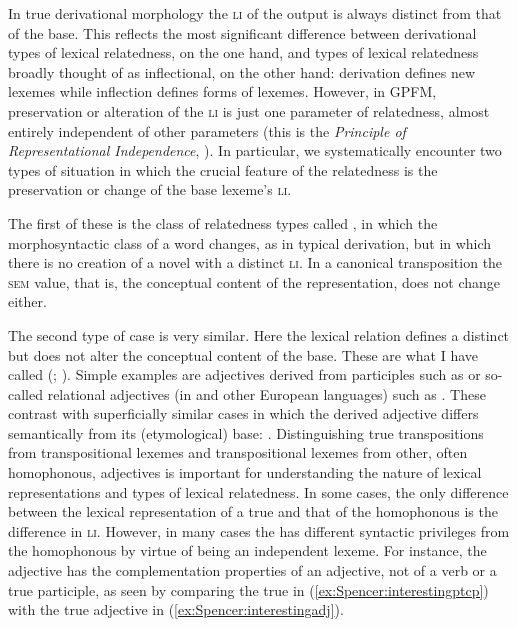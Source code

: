 \documentclass[output=paper]{langsci/langscibook}
\begin{document}
In true derivational morphology the \textsc{li} of the output  is always distinct from that of the base.
This reflects the most significant difference between  derivational types of lexical relatedness, on the one hand, and types of lexical relatedness broadly thought of as inflectional, on the other hand: derivation defines new lexemes while inflection defines forms of lexemes.
 However, in GPFM, preservation or alteration of the \textsc{li} is just one parameter of relatedness, almost entirely independent of other parameters %
(this is the \emph{Principle of Representational Independence}, \citealt[139]{Spencer13}). In particular, we systematically encounter two types of situation in which the crucial feature of the  relatedness is the  preservation or change of the base lexeme's \textsc{li}.

 The first of these is the class of relatedness types called , in which the morphosyntactic class of a word changes, as in typical derivation, but in which there is no creation of a novel  with a distinct \textsc{li}. In a canonical transposition the \textsc{sem} value, that is, the conceptual content of the representation, does not change either.

 The second type of case is very similar. Here the lexical relation defines a distinct  but does not alter the conceptual content of the base. These are what I have called  (\citealt[275; 359]{Spencer13}; \citealt{Spencer16:MorphMetatheory}).  Simple examples are  adjectives derived from participles such as  or so-called relational adjectives (in  and other European languages) such as . These contrast with superficially similar cases in which the derived adjective differs semantically from its (etymological) base: . Distinguishing true transpositions from transpositional lexemes and transpositional lexemes from other, often homophonous, adjectives is important for understanding the nature of lexical representations and types of lexical relatedness. In some cases, the only difference between the lexical representation of a true  and that of the homophonous  is the difference in \textsc{li}. However, in many cases the  has different syntactic privileges from the homophonous  by virtue of being an independent lexeme. For instance, the adjective  has the complementation properties of an adjective, not of a verb or a true participle, as seen by comparing the true  in (\ref{ex:Spencer:interestingptcp}) with the true adjective in (\ref{ex:Spencer:interestingadj}).
\end{document}
